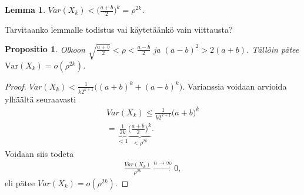 \documentclass[finnish,12pt,a4paper,pdftex,sci,utf8]{aaltothesis}
\newtheorem{lemma}{Lemma}
\newtheorem{propositio}{Propositio}
\begin{document}
\begin{lemma}
	\label{lemma:var_yläraja}
	$Var(X_k) < \big(\frac{a+b}{2} \big)^k = \rho^{2k}$. \cite{reconstruction}
\end{lemma}
Tarvitaanko lemmalle todistus vai käytetäänkö vain viittausta?

\begin{propositio}
	Olkoon $\sqrt{\frac{a+b}{2}} < \rho < \frac{a-b}{2}$ ja $(a-b)^2 > 2(a+b)$. Tällöin pätee $\text{Var}(X_k) = o(\rho^{2k})$.
\end{propositio}

\begin{proof}
	 $Var(X_k) < \frac{1}{k2^{k+1}} \big((a+b)^k + (a-b)^k \big)$. Varianssia voidaan arvioida ylhäältä seuraavasti
	\begin{align*}
		Var(X_k) \leq \frac{1}{k2^{k+1}} \big(a+b \big)^k \\
		= \underbrace{\frac{1}{2k}}_{< 1} \underbrace{\big(\frac{a+b}{2}\big)^k}_{< \rho^{2k}}.
	\end{align*}
	Voidaan siis todeta
	\begin{align*}
		\frac{Var(X_k)}{\rho^{2k}} \xrightarrow[]{n \rightarrow \infty} 0,
	\end{align*}
	eli pätee $Var(X_k) = o(\rho^{2k})$.
\end{proof}
\end{document}
